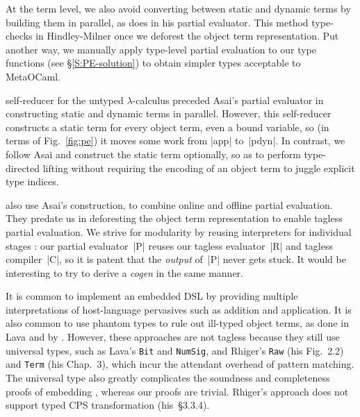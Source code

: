 At the term level, we also avoid converting between static and dynamic
terms by building them in parallel, as \citet{asai-binding-time} does
in his partial evaluator.
This method type-checks in Hindley-Milner once we
deforest the object term representation.  Put another way, we
manually apply type-level partial evaluation to our type
functions (see \S\ref{S:PE-solution}) to obtain simpler types 
acceptable to MetaOCaml.

 self-reducer for the untyped
$\lambda$-calculus preceded Asai's partial evaluator in constructing
static and dynamic terms in parallel.  However, this self-reducer
constructs a static term for every object term, even a bound variable,
so (in terms of Fig.~\ref{fig:pe}) it moves some work from |app|
to~|pdyn|.  In contrast, we follow Asai and construct the static term
optionally, so as to perform type-directed lifting without requiring the
encoding of an object term to juggle explicit type indices.

 also use Asai's construction,
to combine online
and offline partial evaluation.
They predate us in deforesting the object term representation to enable tagless
partial evaluation.
We strive for modularity by reusing interpreters for individual stages
\citep{SperberThiemann:TwoForOne}: our partial evaluator~|P|
reuses our tagless evaluator~|R| and tagless compiler~|C|, so it
is patent that the \emph{output} of~|P| never gets
stuck.  It would be interesting
to try to derive a \emph{cogen} \citep{Thiemann:cogeninsixlines}
in the same manner.

It is common to implement an embedded DSL by providing multiple
interpretations of host\hyp language pervasives such as addition and
application.  It is also common to use phantom types to rule out
ill-typed object terms, as done in Lava
\citep{Lava} and by \citet{Rhiger-thesis}. However, these approaches
are not tagless because they still use universal types, such as Lava's
\texttt{Bit} and \texttt{NumSig}, and Rhiger's \texttt{Raw} (his Fig.~2.2)
and \texttt{Term} (his Chap.~3), which incur the attendant overhead of
pattern matching.  The universal type also
greatly complicates the soundness and completeness proofs of embedding
\citep{Rhiger-thesis}, whereas our proofs are trivial.
Rhiger's approach does not support typed CPS transformation (his~\S3.3.4).
\begin{comment}
Rhiger's But Fig 2.2, p33: universal type Raw.  He uses phantom type
upon the Exp datatype. But that is cheating: phantom type means
essentially we can easily do coerce. We use real types.  That's why he
had to do tedious proofs in Sec 2 of soundness and completeness of
embedding. Whereas our proofs are obvious.  His sec 3 is based on data
representation of terms. They have type tags.  We do nothing of that
kind: See Sec 3.1.2. See numerous "data Term" in Sec3, which is the U
type.  In Sec 3.3.4 (p76) Rhiger specifically says that his encoding
cannot do typed CPS transformation -- whereas our does. BTW, Rhiger
thesis contains the definitions of the interpreter and the compiler,
in the beginning. Use this in response to Rev1)
\end{comment}



